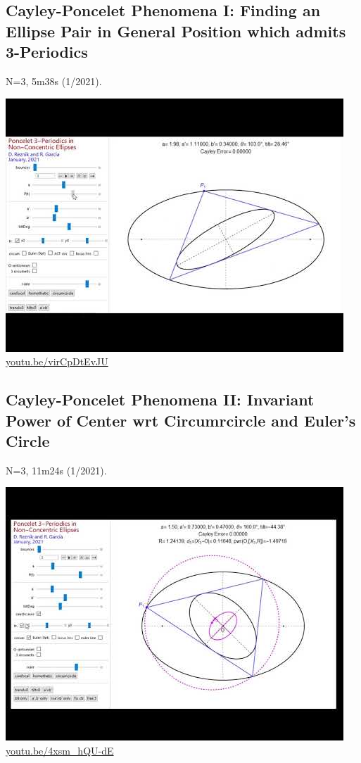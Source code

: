 \documentclass[12pt]{amsart}
\begin{document}
\subsection{Cayley-Poncelet Phenomena I: Finding an Ellipse Pair in General Position which admits 3-Periodics}
\label{vid:virCpDtEvJU}
\noindent N=3, 5m38s (1/2021). 
\begin{center}\includegraphics[width=.5\textwidth]{pics/virCpDtEvJU.jpg} \\ 
\href{https://youtu.be/virCpDtEvJU}{\url{youtu.be/virCpDtEvJU}}\end{center}
% 
\subsection{Cayley-Poncelet Phenomena II: Invariant Power of Center wrt Circumrcircle and Euler's Circle}
\label{vid:4xsm_hQU-dE}
\noindent N=3, 11m24s (1/2021). 
\begin{center}\includegraphics[width=.5\textwidth]{pics/4xsm_hQU-dE.jpg} \\ 
\href{https://youtu.be/4xsm_hQU-dE}{\url{youtu.be/4xsm\_hQU-dE}}\end{center}
% 
\end{document}
